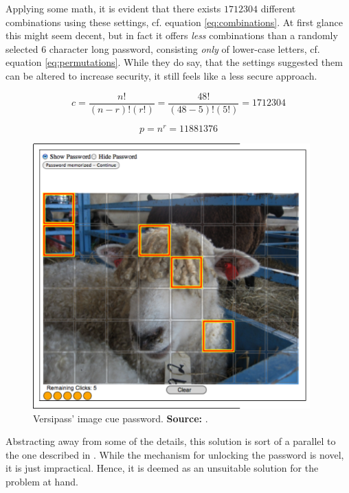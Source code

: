 			Applying some math, it is evident that there exists $1712304$ different combinations using these settings, cf. equation \ref{eq:combinations}. At first glance this might seem decent, but in fact it offers \emph{less} combinations than a randomly selected $6$ character long password, consisting \emph{only} of lower-case letters, cf. equation \ref{eq:permutations}. While they do say, that the settings suggested them can be altered to increase security, it still feels like a less secure approach.

			\begin{equation}
				c = \frac{n!}{(n-r)!(r!)} = \frac{48!}{(48-5)!(5!)} = 1712304
				\label{eq:combinations}
			\end{equation}

			\begin{equation}
				p = n^r = 11881376
				\label{eq:permutations}
			\end{equation}

			\begin{figure}[htbp]
				\centering
				\includegraphics[width=0.95\textwidth]{figures/analysis/versipass_imagecue.png}
				\caption{Versipass' image cue password. \textbf{Source:} \cite[p.3]{stobert2014}.}
				\label{fig:versipass_imagecue}
			\end{figure}

			Abstracting away from some of the details, this solution is sort of a parallel to the one described in \cite{busch2014}. While the mechanism for unlocking the password is novel, it is just impractical. Hence, it is deemed as an unsuitable solution for the problem at hand.

